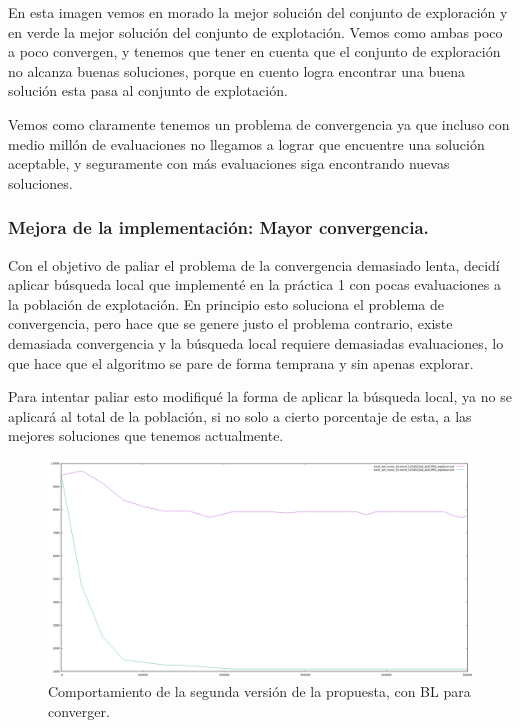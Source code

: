 \documentclass[12pt, spanish]{article}
\begin{document}
En esta imagen vemos en morado la mejor solución del conjunto de exploración y en verde la mejor solución del conjunto de explotación. Vemos como ambas poco a poco convergen, y tenemos que tener en  cuenta que el conjunto de exploración no alcanza buenas soluciones, porque en cuento logra encontrar una buena solución esta pasa al conjunto de explotación.

Vemos como claramente tenemos un problema de convergencia ya que incluso con medio millón de evaluaciones no llegamos a lograr que encuentre una solución aceptable, y seguramente con más evaluaciones siga encontrando nuevas soluciones.


\subsubsection{Mejora de la implementación: Mayor convergencia.}

Con el objetivo de paliar el problema de la convergencia demasiado lenta, decidí aplicar búsqueda local que implementé en la práctica 1 con pocas evaluaciones a la población de explotación. En principio esto soluciona el problema de convergencia, pero hace que se genere justo el problema contrario, existe demasiada convergencia y la búsqueda local requiere demasiadas evaluaciones, lo que hace que el algoritmo se pare de forma temprana y sin apenas explorar.

Para intentar paliar esto modifiqué la forma de aplicar la búsqueda local, ya no se aplicará al total de la población, si no solo a cierto porcentaje de esta, a las mejores soluciones que tenemos actualmente.


\begin{figure}[H]
	\centering
	\includegraphics[scale = 0.33]{con_BL_explotar.png}
	
	\caption{Comportamiento de la segunda versión de la propuesta, con BL para converger.}
	\label{fig:basico_BL}
\end{figure}
\end{document}
